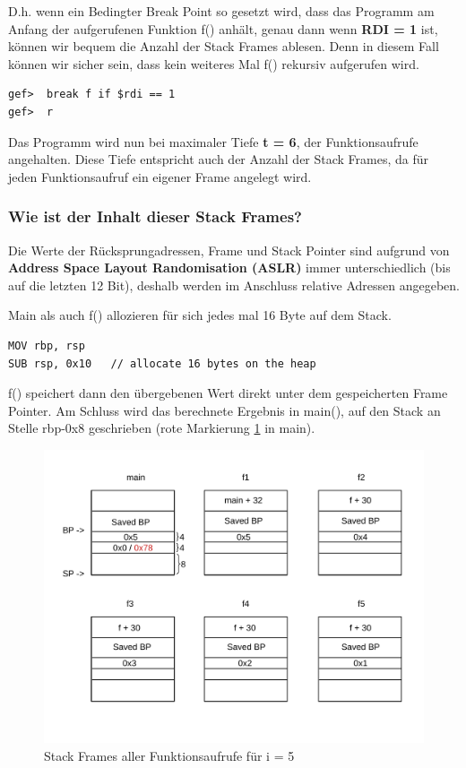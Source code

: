\documentclass[12pt]{article}
\begin{document}
D.h. wenn ein Bedingter Break Point so gesetzt wird, dass das Programm am Anfang der aufgerufenen Funktion f() anhält, genau dann wenn \textbf{RDI = 1} ist, können wir bequem die Anzahl der Stack Frames ablesen. Denn in diesem Fall können wir sicher sein, dass kein weiteres Mal f() rekursiv aufgerufen wird.

\begin{lstlisting}
gef>  break f if $rdi == 1
gef>  r
\end{lstlisting}

Das Programm wird nun bei maximaler Tiefe \textbf{t = 6}, der Funktionsaufrufe angehalten. Diese Tiefe entspricht auch der Anzahl der Stack Frames, da für jeden Funktionsaufruf ein eigener Frame angelegt wird.


\subsubsection{Wie ist der Inhalt dieser Stack Frames?}
Die Werte der Rücksprungadressen, Frame und Stack Pointer sind aufgrund von \textbf{Address Space Layout Randomisation (ASLR)} immer unterschiedlich (bis auf die letzten 12 Bit), deshalb werden im Anschluss relative Adressen angegeben.

Main als auch f() allozieren für sich jedes mal 16 Byte auf dem Stack. 
\begin{lstlisting}
MOV rbp, rsp
SUB rsp, 0x10	// allocate 16 bytes on the heap
\end{lstlisting}

f() speichert dann den übergebenen Wert direkt unter dem gespeicherten Frame Pointer. Am Schluss wird das berechnete Ergebnis in main(), auf den Stack an Stelle rbp-0x8 geschrieben (rote Markierung \ref{fig:recursive3} in main).

\begin{center}
\begin{figure}[H]
	\includegraphics[scale=0.8, angle=90]{Pictures/a3_stack_frames.pdf}
	\caption{Stack Frames aller Funktionsaufrufe für i = 5}
	\label{fig:recursive3}
\end{figure}
\end{center}
\end{document}
